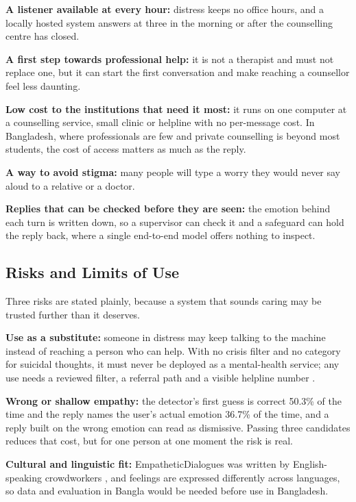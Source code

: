 \textbf{A listener available at every hour: }distress keeps no office hours, and a locally hosted system answers at three in the morning or after the counselling centre has closed.

\textbf{A first step towards professional help:} it is not a therapist and must not replace one, but it can start the first conversation and make reaching a counsellor feel less daunting.

\textbf{Low cost to the institutions that need it most: }it runs on one computer at a counselling service, small clinic or helpline with no per-message cost. In Bangladesh, where professionals are few and private counselling is beyond most students, the cost of access matters as much as the reply.

\textbf{A way to avoid stigma: }many people will type a worry they would never say aloud to a relative or a doctor.

\textbf{Replies that can be checked before they are seen: }the emotion behind each turn is written down, so a supervisor can check it and a safeguard can hold the reply back, where a single end-to-end model offers nothing to inspect.

\subsection{Risks and Limits of Use}

Three risks are stated plainly, because a system that sounds caring may be trusted further than it deserves.

\textbf{Use as a substitute: }someone in distress may keep talking to the machine instead of reaching a person who can help. With no crisis filter and no category for suicidal thoughts, it must never be deployed as a mental-health service; any use needs a reviewed filter, a referral path and a visible helpline number \cite{who2023suicide}.

\textbf{Wrong or shallow empathy: }the detector's first guess is correct 50.3\% of the time and the reply names the user's actual emotion 36.7\% of the time, and a reply built on the wrong emotion can read as dismissive. Passing three candidates reduces that cost, but for one person at one moment the risk is real.

\textbf{Cultural and linguistic fit:} EmpatheticDialogues was written by English-speaking crowdworkers \cite{rashkin2019}, and feelings are expressed differently across languages, so data and evaluation in Bangla would be needed before use in Bangladesh.

